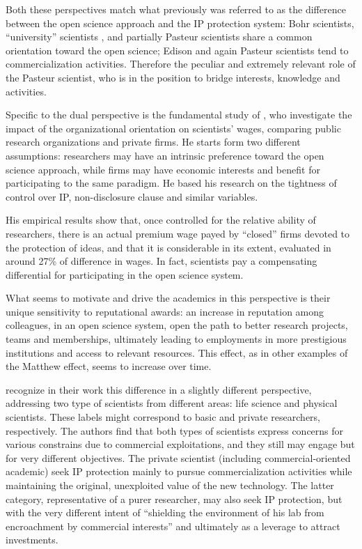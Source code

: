 Both these perspectives match what previously was referred to as the difference between the open science approach and the IP protection system: Bohr scientists, \enquote{university} scientists \citep{Beath2000}, and partially Pasteur scientists share a common orientation toward the open science; Edison and again Pasteur scientists tend to commercialization activities. Therefore the peculiar and extremely relevant role of the Pasteur scientist, who is in the position to bridge interests, knowledge and activities.

Specific to the dual perspective is the fundamental study of \citet{Stern2004}, who investigate the impact of the organizational orientation on scientists' wages, comparing public research organizations and private firms. He starts form two different assumptions: researchers may have an intrinsic preference toward the open science approach, while firms may have economic interests and benefit for participating to the same paradigm. He based his research on the tightness of control over IP, non-disclosure clause and similar variables.

His empirical results show that, once controlled for the relative ability of researchers, there is an actual premium wage payed by \enquote{closed} firms devoted to the protection of ideas, and that it is considerable in its extent, evaluated in around 27\% of difference in wages. In fact, scientists pay a compensating differential for participating in the open science system. 

What seems to motivate and drive the academics in this perspective is their unique sensitivity to reputational awards: an increase in reputation among colleagues, in an open science system, open the path to better research projects, teams and memberships, ultimately leading to employments in more prestigious institutions and access to relevant resources. This effect, as in other examples of the Matthew effect, seems to increase over time.

\citet{OwenSmith2001} recognize in their work this difference in a slightly different perspective, addressing two type of scientists from different areas: life science and physical scientists. These labels might correspond to basic and private researchers, respectively. The authors find that both types of scientists express concerns for various constrains due to commercial exploitations, and they still may engage but for very different objectives. The private scientist (including commercial-oriented academic) seek IP protection mainly to pursue commercialization activities while maintaining the original, unexploited value of the new technology. The latter category, representative of a purer researcher, may also seek IP protection, but with the very different intent of \enquote{shielding the environment of his lab from encroachment by commercial interests} and ultimately as a leverage to attract investments.

